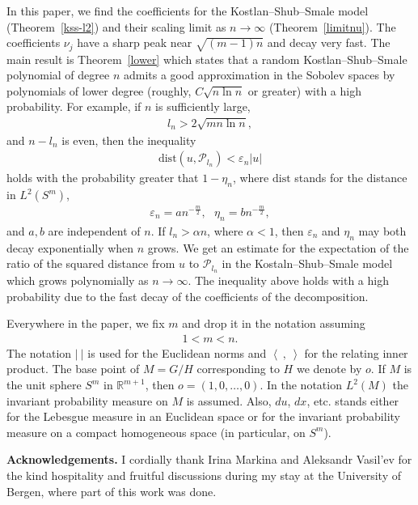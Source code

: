 \documentclass[10pt]{amsart}
\theoremstyle{remark}
\begin{document}
In this paper, we find the coefficients for the
Kostlan--Shub--Smale model (Theorem~\ref{kss-l2}) and their
scaling limit as $n\to\infty$ (Theorem~\ref{limitnu}). The
coefficients $\nu_j$ have a sharp peak near $\sqrt{(m-1)n}$ and
decay very fast. The main result is Theorem~\ref{lower} which
states that
a random Kostlan--Shub--Smale polynomial of degree $n$ admits a
good approximation in the Sobolev spaces by polynomials of lower
degree (roughly, $C\sqrt{n\ln n}$ or greater) with a high
probability. For example, if $n$ is sufficiently large,
\begin{eqnarray*}
l_n>2\sqrt{mn\ln n},
\end{eqnarray*}
and $n-l_n$ is even, then the inequality
\begin{eqnarray*}
{\mathrm{dist}}\left(u,{\mathcal{P}}_{l_n}\right)<{{\mathord{\varepsilon}}}_n|u|
\end{eqnarray*}
holds with the probability greater that $1-\eta_n$, where ${\mathrm{dist}}$
stands for the distance in $L^2(S^m)$,
\begin{eqnarray*}
{{\mathord{\varepsilon}}}_n=a n^{-\frac{m}{2}},~~~\eta_n=bn^{-\frac{m}{2}},
\end{eqnarray*}
 and $a,b$ are
independent of $n$. If $l_n>{{\mathord{\alpha}}} n$, where ${{\mathord{\alpha}}}<1$, then ${{\mathord{\varepsilon}}}_n$
and $\eta_n$ may both decay exponentially when $n$ grows. We get
an estimate for the expectation of the ratio of the squared
distance from $u$ to ${\mathcal{P}}_{l_n}$ in the Kostaln--Shub--Smale model
which grows polynomially as $n\to\infty$. The inequality above
holds with a high probability due to the fast decay of the
coefficients of the decomposition.

Everywhere in the paper, we fix $m$ and drop it in the notation
assuming
\begin{eqnarray}\label{assmn}
1<m<n.
\end{eqnarray}
The notation $|\ |$ is used for the Euclidean norms and ${\left<{\
},{\ }\right>}$ for the relating inner product. The base point of $M=G/H$
corresponding to $H$ we denote by $o$. If $M$ is the unit sphere
$S^m$ in ${\mathbb{R}}^{m+1}$, then $o=(1,0,\dots,0)$. In the notation
$L^2(M)$ the invariant probability measure on $M$ is assumed.
Also, $du$, $dx$, etc. stands either for the Lebesgue measure in
an Euclidean space or for the invariant probability measure on a
compact homogeneous space (in particular, on $S^m$).

\medskip

{\bf Acknowledgements.} I cordially thank Irina Markina and
Aleksandr Vasil'ev for the kind hospitality and fruitful
discussions during my stay at the University of Bergen, where part
of this work was done.
\end{document}
